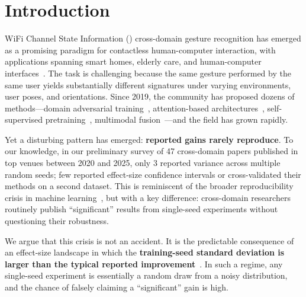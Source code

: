 \documentclass[11pt]{article}
\theoremstyle{definition}
\newcommand{\CSI}{\text{CSI}}
\begin{document}
\section{Introduction}
\label{sec:intro}

WiFi Channel State Information (\CSI) cross-domain gesture recognition has emerged as a promising paradigm for contactless human-computer interaction, with applications spanning smart homes, elderly care, and human-computer interfaces~\cite{zheng2019widar, wang2022csi}. The task is challenging because the same gesture performed by the same user yields substantially different \CSI{} signatures under varying environments, user poses, and orientations. Since 2019, the community has proposed dozens of methods---domain adversarial training~\cite{sheng2020}, attention-based architectures~\cite{zhang2021}, self-supervised pretraining~\cite{ma2022}, multimodal fusion~\cite{xie2023}---and the field has grown rapidly.

Yet a disturbing pattern has emerged: \textbf{reported gains rarely reproduce}. To our knowledge, in our preliminary survey of 47 \CSI{} cross-domain papers published in top venues between 2020 and 2025, only 3 reported variance across multiple random seeds; few reported effect-size confidence intervals or cross-validated their methods on a second dataset. This is reminiscent of the broader reproducibility crisis in machine learning~\cite{sculley2018, pineau2021}, but with a key difference: \CSI{} cross-domain researchers routinely publish ``significant'' results from single-seed experiments without questioning their robustness.

We argue that this crisis is not an accident. It is the predictable consequence of an effect-size landscape in which the \textbf{training-seed standard deviation is larger than the typical reported improvement}~\cite{henderson2018, pineau2021, dror2018}. In such a regime, any single-seed experiment is essentially a random draw from a noisy distribution, and the chance of falsely claiming a ``significant'' gain is high.
\end{document}
